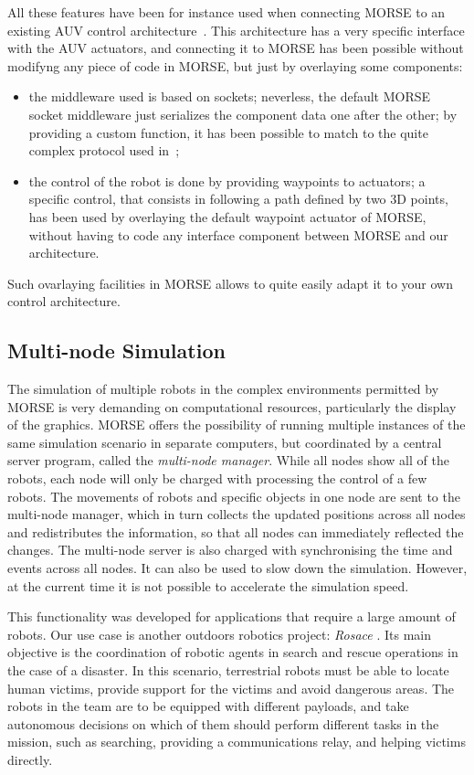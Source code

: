 \documentclass{llncs}
\begin{document}
All these features have been for instance used when connecting MORSE to an existing AUV
control architecture~\cite{barbier2011}. This architecture has a very specific interface
with the AUV actuators, and connecting it to MORSE has been possible without modifyng any
piece of code in MORSE, but just by overlaying some components:
\begin{itemize}
\item the middleware used is based on sockets; neverless, the default MORSE socket middleware 
just serializes the component data one after the other; by providing a custom function, it
has been possible to match to the quite complex protocol used in~\cite{barbier2011};
\item the control of the robot is done by providing waypoints to actuators; a specific control,
that consists in following a path defined by two 3D points, has been used by overlaying the
default waypoint actuator of MORSE, without having to code any interface component between
MORSE and our architecture.
\end{itemize}

Such ovarlaying facilities in MORSE allows to quite easily adapt it to your own control architecture.


\subsection{Multi-node Simulation}
\label{section:multinode}

The simulation of multiple robots in the complex environments permitted by
MORSE is very demanding on computational resources, particularly the
display of the graphics. MORSE offers the possibility of running multiple
instances of the same simulation scenario in separate computers, but
coordinated by a central server program, called the \emph{multi-node
manager}. While all nodes show all of the robots, each node will only
be charged with processing the control of a few robots. The movements
of robots and specific objects in one node are sent to the multi-node
manager, which in turn collects the updated positions across all nodes
and redistributes the information, so that all nodes can immediately
reflected the changes.  The multi-node server is also charged with
synchronising the time and events across all nodes. It can also be used
to slow down the simulation. However, at the current time it is not
possible to accelerate the simulation speed.

This functionality was developed for applications that require a large amount
of robots. Our use case is another outdoors robotics project: \emph{Rosace}
\cite{springerlink:10.1007/978-3-642-12384-9_18,springerlink:10.1007/978-3-642-28786-2_32}.
Its main objective is the coordination of robotic agents in search and rescue
operations in the case of a disaster. In this scenario, terrestrial robots must
be able to locate human victims, provide support for the victims and avoid
dangerous areas. The robots in the team are to be equipped with different
payloads, and take autonomous decisions on which of them should perform
different tasks in the mission, such as searching, providing a communications
relay, and helping victims directly.
\end{document}
